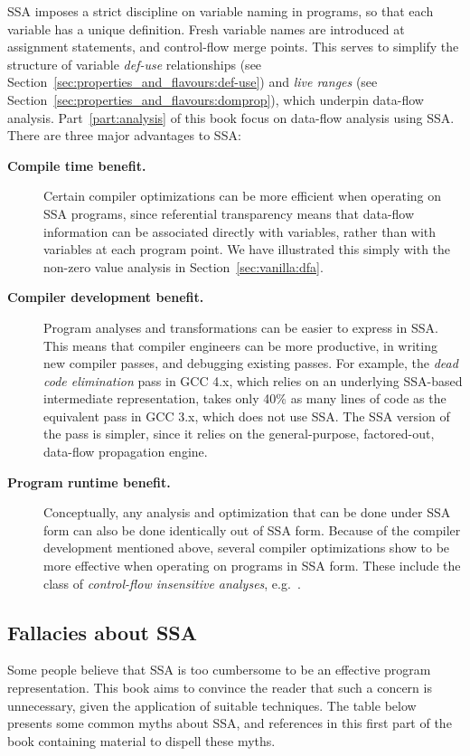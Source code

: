 SSA imposes a strict discipline on variable naming in programs,
so that each variable has a unique definition.
Fresh variable names are introduced at assignment statements,
and control-flow merge points.
This serves to simplify the structure of variable \emph{def-use} 
relationships (see Section~\ref{sec:properties_and_flavours:def-use}) 
and \emph{live ranges} (see Section~\ref{sec:properties_and_flavours:domprop}),
which underpin data-flow analysis. Part~\ref{part:analysis} of this book focus
on data-flow analysis using SSA. There are three major advantages to SSA:
\begin{description}
\item[\textbf{Compile time benefit.}]
Certain compiler optimizations can be more efficient
when operating on SSA programs, since
referential transparency means that data-flow information
can be associated directly with variables, rather than with variables
at each program point. We have illustrated this simply with the
non-zero value analysis in Section~\ref{sec:vanilla:dfa}.
\item[\textbf{Compiler development benefit.}]
Program analyses and transformations can be easier
to express in SSA. This means that compiler engineers
can be more productive, in writing new compiler passes,
and debugging existing passes.
For example, the \textit{dead code elimination} pass
in GCC 4.x, which relies on an underlying SSA-based intermediate
representation, takes only 40\% as many lines of code
as the equivalent pass in GCC 3.x, which does not use SSA.
The SSA version of the pass is simpler, since it
relies on the general-purpose, factored-out, data-flow propagation
engine.
\item[\textbf{Program runtime benefit.}]
Conceptually, any analysis and optimization that can be done under SSA form can also be done identically out of SSA form. Because of the compiler development mentioned above, several compiler optimizations show to be more effective
when operating on programs in SSA form. These include the
class of \textit{control-flow insensitive analyses}, e.g.\
\cite{hasti98using}.
\end{description}


\vspace{-2ex}
\subsection{Fallacies about SSA}
\vspace{-1mm}

Some people believe that SSA is too cumbersome to be an effective
program representation. 
This book aims to convince the reader that
such a concern is
unnecessary,
given the application of suitable techniques.
The table below presents some common myths
about SSA,
and references in this
first part of the book 
containing material to dispell
these myths.


